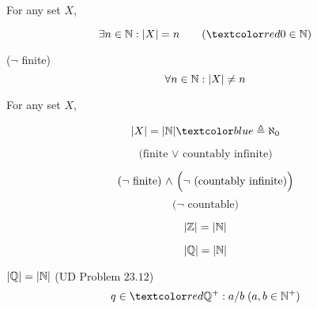 \begin{frame}{}
  \begin{definition}
    For any set $X$,
    \begin{description}[Infinite]
      \item[Finite] 
	\[
	  \exists n \in \N: |X| = n  \qquad (\red{0 \in \N})
	\]
      \item[Infinite] ($\lnot$ finite)
	\[
	  \forall n \in \mathbb{N}: |X| \neq n
	\]
    \end{description}
  \end{definition}

\end{frame}

\begin{frame}{}
  \begin{definition}
    For any set $X$,
    \begin{description}
      \item[Countably Infinite]
	\[
	  |X| = |\N| \blue{\;\triangleq \aleph_{0}}
	\]
      \item[Countable]
	\[
	  \text{(finite $\lor$ countably infinite)}
	\]
      \item[Uncountably Infinite] 
	\[
	  \text{($\lnot$ finite) $\land$ \Big($\lnot$ (countably infinite)\Big)}
	\]
	\[
	  \text{($\lnot$ countable)}
	\]
    \end{description}
  \end{definition}
\end{frame}

\begin{frame}{}
  \begin{theorem}[$\Z$ is Countable.]
    \[
      |\mathbb{Z}| = |\mathbb{N}|
    \]
  \end{theorem}
\end{frame}

\begin{frame}{}
  \begin{theorem}
    \[
      |\mathbb{Q}| = |\mathbb{N}|
    \]
  \end{theorem}

  \pause
  \begin{exampleblock}{$|\mathbb{Q}| = |\mathbb{N}|$ (UD Problem $23.12$)}
    \[
      q \in \red{\Q^{+}}: a / b \; (a,b \in \N^{+})
    \]
    \begin{columns}
    \end{columns}
  \end{exampleblock}
\end{frame}


